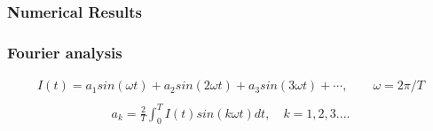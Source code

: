 \documentclass[aspectratio=1610]{beamer}
\begin{document}
\begin{frame}
\frametitle{Numerical Results}
\end{frame}
\begin{frame}
\frametitle{Fourier analysis}
\large
\begin{align*}
I(t)=a_{1}sin(\omega t)+a_{2}sin(2\omega t)+a_{3}sin(3\omega t)+\cdots, \quad  \quad \omega = 2\pi/T\\
\end{align*}
\begin{align*}
a_{k} = \frac{2}{T}\int_{0}^{T} I(t)sin(k\omega t)dt,\quad k=1,2,3....
\end{align*}
\end{frame}
\end{document}
